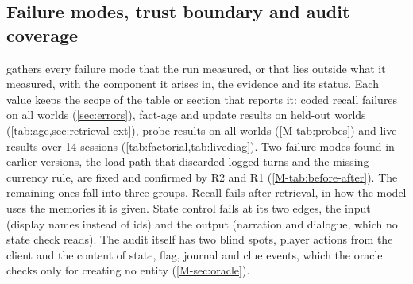 \documentclass[letterpaper,journal,onecolumn]{IEEEtran}
\begin{document}
\subsection{Failure modes, trust boundary and audit coverage}\label{sec:failures}

 gathers every failure mode that the run measured, or that lies outside what it measured, with the component it arises in, the evidence and its status. Each value keeps the scope of the table or section that reports it: coded recall failures on all worlds (\cref{sec:errors}), fact-age and update results on held-out worlds (\cref{tab:age,sec:retrieval-ext}), probe results on all worlds (\cref{M-tab:probes}) and live results over 14 sessions (\cref{tab:factorial,tab:livediag}). Two failure modes found in earlier versions, the load path that discarded logged turns and the missing currency rule, are fixed and confirmed by R2 and R1 (\cref{M-tab:before-after}). The remaining ones fall into three groups. Recall fails after retrieval, in how the model uses the memories it is given. State control fails at its two edges, the input (display names instead of ids) and the output (narration and dialogue, which no state check reads). The audit itself has two blind spots, player actions from the client and the content of state, flag, journal and clue events, which the oracle checks only for creating no entity (\cref{M-sec:oracle}).
\end{document}
